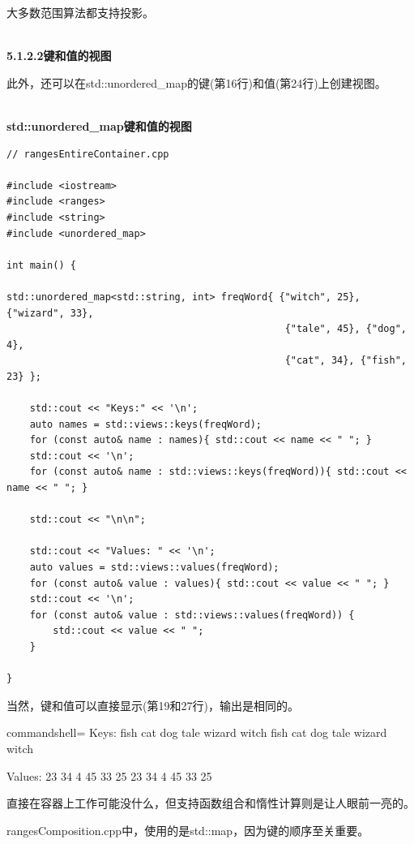 大多数范围算法都支持投影。

\hspace*{\fill} \\ %
\noindent
\textbf{5.1.2.2\hspace{0.2cm}键和值的视图}

此外，还可以在std::unordered\_map的键(第16行)和值(第24行)上创建视图。

\hspace*{\fill} \\ %
\noindent
\textbf{std::unordered\_map键和值的视图}
\begin{lstlisting}[style=styleCXX]
// rangesEntireContainer.cpp

#include <iostream>
#include <ranges>
#include <string>
#include <unordered_map>

int main() {

std::unordered_map<std::string, int> freqWord{ {"witch", 25}, {"wizard", 33},
												{"tale", 45}, {"dog", 4},
												{"cat", 34}, {"fish", 23} };

	std::cout << "Keys:" << '\n';
	auto names = std::views::keys(freqWord);
	for (const auto& name : names){ std::cout << name << " "; }
	std::cout << '\n';
	for (const auto& name : std::views::keys(freqWord)){ std::cout << name << " "; }
	
	std::cout << "\n\n";

	std::cout << "Values: " << '\n';
	auto values = std::views::values(freqWord);
	for (const auto& value : values){ std::cout << value << " "; }
	std::cout << '\n';
	for (const auto& value : std::views::values(freqWord)) {
		std::cout << value << " ";
	}

}
\end{lstlisting}

当然，键和值可以直接显示(第19和27行)，输出是相同的。

\begin{tcblisting}{commandshell={}}
Keys:
fish cat dog tale wizard witch
fish cat dog tale wizard witch

Values:
23 34 4 45 33 25
23 34 4 45 33 25
\end{tcblisting}

直接在容器上工作可能没什么，但支持函数组合和惰性计算则是让人眼前一亮的。


rangesComposition.cpp中，使用的是std::map，因为键的顺序至关重要。

